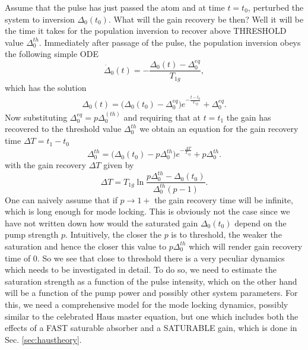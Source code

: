 \documentclass[preprint,secnumarabic,amssymb, nobibnotes, aip, prd]{revtex4-1}
\begin{document}
Assume that the pulse has just passed the atom and at time $t=t_0$, perturbed the system to inversion $\Delta_0(t_0)$. What will the gain recovery be then? Well it will be the time it takes for the population inversion to recover above THRESHOLD value $\Delta_{0}^{th}$. Immediately after passage of the pulse, the population inversion obeys the following simple ODE
\begin{equation}
\dot\Delta_0(t) = -\frac{\Delta_0(t) -\Delta_0^{eq}}{T_{1g}},
\end{equation}    
which has the solution 
\begin{eqnarray}
\Delta_0(t) = \big(\Delta_0(t_0) -\Delta_0^{eq}\big)e^{-\frac{t-t_0}{T_{1g}}}+\Delta_0^{eq}.
\end{eqnarray}
Now substituting $\Delta_0^{eq} = p\Delta_0^{(th)}$ and requiring that at $t=t_1$ the gain has recovered to the threshold value $\Delta_0^{th}$ we obtain an equation for the gain recovery time $\Delta T = t_1-t_0$ 
\begin{equation}
\Delta_{0}^{th} = \big(\Delta_0(t_0) - p\Delta_0^{th}\big)e^{-\frac{\Delta T}{T_{1g}}}+p\Delta_0^{th}.
\end{equation}
with the gain recovery $\Delta T $ given by
\begin{equation}
\Delta T = T_{1g} \ln\frac{p\Delta_0^{th}-\Delta_0(t_0)}{\Delta_0^{th}(p-1)}.
\end{equation}
One can naively assume that if $p\to1+$ the gain recovery time will be infinite, which is long enough for mode locking. This is obviously not the case since we have not written down how would the saturated gain $\Delta_0(t_0)$ depend on the pump strength $p$. Intuitively, the closer the $p$ is to threshold, the weaker the saturation and hence the closer this value to $p\Delta_0^{th}$ which will render gain recovery time of 0. So we see that close to threshold there is a very peculiar dynamics which needs to be investigated in detail. To do so, we need to estimate the saturation strength as a function of the pulse intensity, which on the other hand will be a function of the pump power and possibly other system parameters. For this, we need a comprehensive model for the mode locking dynamics, possibly similar to the celebrated Haus master equation, but one which includes both the effects of a FAST saturable absorber and a SATURABLE gain, which is done in Sec. \ref{sec:haustheory}. 
\end{document}
